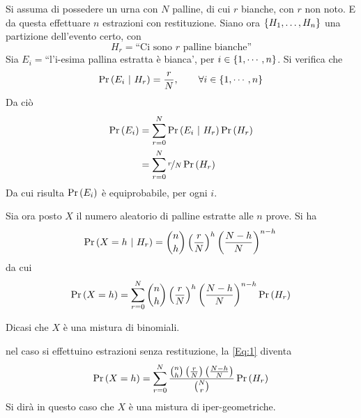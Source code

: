 \documentclass{subfiles}
\begin{document}
Si assuma di possedere un urna con \(N\) palline, di cui \(r\) bianche, con \(r\) non noto. E da questa effettuare \(n\) estrazioni con restituzione.
Siano ora \(\Set{\List{H}{1}{n}}\) una partizione dell'evento certo, con
\[
    H_{r} = \text{``Ci sono \(r\) palline bianche''}
\]
Sia \(E_{i} = \)``l'i-esima pallina estratta è bianca', per \(i \in \Set{1, \cdots, n}\).
Si verifica che
\[
    \Prob{E_{i}}[H_{r}] = \Frac{r}{N}   ,\qquad \forall i \in \Set{1, \cdots, n}
\]
Da ciò
\[\begin{aligned}
        \Prob{E_{i}} & = \Sum{\Prob{E_{i}}[H_{r}] \Prob{H_{r}}}{r = 0}[N] \\
                     & = \Sum{\Frac*{r}{N} \Prob{H_{r}}}{r = 0}[N]        \\
    \end{aligned}\]
Da cui risulta \(\Prob{E_{i}}\) è equiprobabile, per ogni \(i\).

Sia ora posto \(X\) il numero aleatorio di palline estratte alle \(n\) prove. Si ha
\[
    \Prob{X = h}[H_{r}]  = \binom{n}{h} \left(\Frac{r}{N}\right)^{h} \left(\Frac{N - h}{N}\right)^{n - h}                              \\
\]
da cui
\begin{equation}
    \Prob{X = h} = \Sum{\binom{n}{h} \left(\Frac{r}{N}\right)^{h} \left(\Frac{N - h}{N}\right)^{n - h} \Prob{H_{r}}}{r = 0}[N]
\end{equation}

Dicasi che \(X\) è una mistura di binomiali.
\begin{Note*}
    nel caso si effettuino estrazioni senza restituzione, la \eqref{Eq:1} diventa
    \[
        \Prob{X = h} = \Sum{\Frac{\binom{n}{h} \left(\Frac{r}{N}\right) \left(\Frac{N - h}{N}\right)}{\binom{N}{r}}\Prob{H_{r}}}{r = 0}[N]
    \]
    Si dirà in questo caso che \(X\) è una mistura di iper-geometriche.
\end{Note*}
\end{document}
